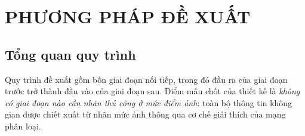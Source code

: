 \chapter{PHƯƠNG PHÁP ĐỀ XUẤT}
\label{chap:phuongphap}

\section{Tổng quan quy trình}
\label{sec:tongquan}

Quy trình đề xuất gồm bốn giai đoạn nối tiếp, trong đó đầu ra của giai đoạn trước
trở thành đầu vào của giai đoạn sau. Điểm mấu chốt của thiết kế là \emph{không có
giai đoạn nào cần nhãn thủ công ở mức điểm ảnh}: toàn bộ thông tin không gian được
chiết xuất từ nhãn mức ảnh thông qua cơ chế giải thích của mạng phân loại.

